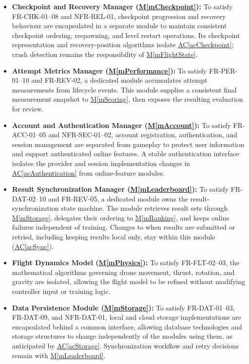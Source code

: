 \documentclass[12pt, titlepage]{article}
\DeclareRobustCommand{\mgabbr}[2]{\hyperlink{mg-abbr:#1}{#2}}
\newcommand{\acref}[1]{\mgabbr{ac}{AC}\ref{#1}}
\newcommand{\mref}[1]{\hyperref[#1]{M\ref*{#1}}}
\begin{document}
\begin{itemize}
    \item \textbf{Checkpoint and Recovery Manager (\mref{mCheckpoint}):}
    To satisfy FR-CHK-01--08 and NFR-REL-01, checkpoint
    progression and recovery behaviour are encapsulated in
    a separate module to maintain consistent checkpoint
    ordering, respawning, and level restart operations. Its checkpoint
    representation and recovery-position algorithms isolate
    \acref{acCheckpoint}; crash detection remains the responsibility
    of \mref{mFlightState}.

    \item \textbf{Attempt Metrics Manager
    (\mref{mPerformance}):}
    To satisfy FR-PER-01--10 and FR-REV-02, a dedicated
    module accumulates attempt measurements from lifecycle events.
    This module supplies a consistent final measurement snapshot to
    \mref{mScoring}, then exposes the resulting evaluation for review.

    \item \textbf{Account and Authentication Manager (\mref{mAccount}):}
    To satisfy FR-ACC-01--05 and NFR-SEC-01--02, account
    registration, authentication, and session management
    are separated from gameplay to protect user information
    and support authenticated online features. A stable authentication
    interface isolates the provider and session implementation changes
    in \acref{acAuthentication} from online-feature modules.

    \item \textbf{Result Synchronization Manager (\mref{mLeaderboard}):}
    To satisfy FR-DAT-02--10 and FR-REV-05, a dedicated
    module owns the result-synchronization state machine. The module retrieves
    result sets through \mref{mStorage}, delegates their ordering to
    \mref{mRanking}, and keeps online failures independent of training.
    Changes to when results are submitted or retried, including keeping
    results local only, stay within this module (\acref{acSync}).

    \item \textbf{Flight Dynamics Model (\mref{mPhysics}):}
    To satisfy FR-FLT-02--03, the mathematical algorithms
    governing drone movement, thrust, rotation, and gravity
    are isolated, allowing the flight model to be refined
    without modifying controller input or training logic.

    \item \textbf{Data Persistence Module (\mref{mStorage}):}
    To satisfy FR-DAT-01--03, FR-DAT-09, and NFR-DAT-01,
    local and cloud storage implementations are
    encapsulated behind a common interface, allowing
    database technologies and storage structures to change
    independently of the modules using them, as anticipated by
    \acref{acStorage}. Synchronization workflow and retry decisions
    remain with \mref{mLeaderboard}.


\end{itemize}
\end{document}
